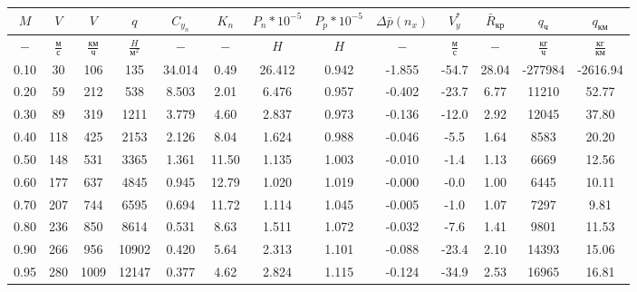 \begin{tabular}{|c|c|c|c|c|c|c|c|c|c|c|c|c|}
\hline
$M$ & $V$ & $V$ & $q$ & $C_{y_n}$ & $K_n$ & $P_n*10^{-5}$ & $P_p*10^{-5}$ & $\Delta \bar{p}(n_x)$ & $V_y^*$ & $\bar{R}_{кр}$ & $q_{ч}$ & $q_{км}$ \\ 
\hline
$-$ & $\frac{м}{с}$ & $\frac{км}{ч}$ & $\frac{H}{м^2}$ & $-$ & $-$ & $H$ & $H$ & $-$ & $\frac{м}{с}$ & $-$ & $\frac{кг}{ч}$ & $\frac{кг}{км}$ \\ 
\hline
0.10 & 30 & 106 & 135 & 34.014 & 0.49 & 26.412 & 0.942 & -1.855 & -54.7 & 28.04 & -277984 & -2616.94 \\ 
\hline
0.20 & 59 & 212 & 538 & 8.503 & 2.01 & 6.476 & 0.957 & -0.402 & -23.7 & 6.77 & 11210 & 52.77 \\ 
\hline
0.30 & 89 & 319 & 1211 & 3.779 & 4.60 & 2.837 & 0.973 & -0.136 & -12.0 & 2.92 & 12045 & 37.80 \\ 
\hline
0.40 & 118 & 425 & 2153 & 2.126 & 8.04 & 1.624 & 0.988 & -0.046 & -5.5 & 1.64 & 8583 & 20.20 \\ 
\hline
0.50 & 148 & 531 & 3365 & 1.361 & 11.50 & 1.135 & 1.003 & -0.010 & -1.4 & 1.13 & 6669 & 12.56 \\ 
\hline
0.60 & 177 & 637 & 4845 & 0.945 & 12.79 & 1.020 & 1.019 & -0.000 & -0.0 & 1.00 & 6445 & 10.11 \\ 
\hline
0.70 & 207 & 744 & 6595 & 0.694 & 11.72 & 1.114 & 1.045 & -0.005 & -1.0 & 1.07 & 7297 & 9.81 \\ 
\hline
0.80 & 236 & 850 & 8614 & 0.531 & 8.63 & 1.511 & 1.072 & -0.032 & -7.6 & 1.41 & 9801 & 11.53 \\ 
\hline
0.90 & 266 & 956 & 10902 & 0.420 & 5.64 & 2.313 & 1.101 & -0.088 & -23.4 & 2.10 & 14393 & 15.06 \\ 
\hline
0.95 & 280 & 1009 & 12147 & 0.377 & 4.62 & 2.824 & 1.115 & -0.124 & -34.9 & 2.53 & 16965 & 16.81 \\ 
\hline
\end{tabular}